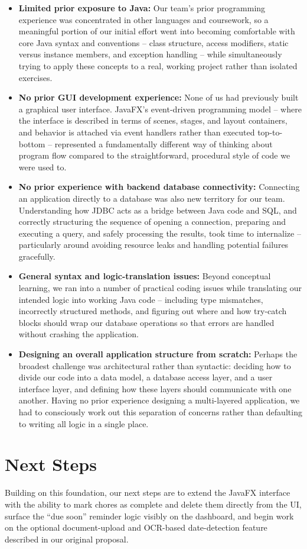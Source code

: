 \documentclass[11pt,a4paper]{article}
\begin{document}
\begin{itemize}[leftmargin=0.7cm]
    \item \textbf{Limited prior exposure to Java:} Our team's prior programming experience was concentrated in other languages and coursework, so a meaningful portion of our initial effort went into becoming comfortable with core Java syntax and conventions -- class structure, access modifiers, static versus instance members, and exception handling -- while simultaneously trying to apply these concepts to a real, working project rather than isolated exercises.

    \item \textbf{No prior GUI development experience:} None of us had previously built a graphical user interface. JavaFX's event-driven programming model -- where the interface is described in terms of scenes, stages, and layout containers, and behavior is attached via event handlers rather than executed top-to-bottom -- represented a fundamentally different way of thinking about program flow compared to the straightforward, procedural style of code we were used to.

    \item \textbf{No prior experience with backend database connectivity:} Connecting an application directly to a database was also new territory for our team. Understanding how JDBC acts as a bridge between Java code and SQL, and correctly structuring the sequence of opening a connection, preparing and executing a query, and safely processing the results, took time to internalize -- particularly around avoiding resource leaks and handling potential failures gracefully.

    \item \textbf{General syntax and logic-translation issues:} Beyond conceptual learning, we ran into a number of practical coding issues while translating our intended logic into working Java code -- including type mismatches, incorrectly structured methods, and figuring out where and how try-catch blocks should wrap our database operations so that errors are handled without crashing the application.

    \item \textbf{Designing an overall application structure from scratch:} Perhaps the broadest challenge was architectural rather than syntactic: deciding how to divide our code into a data model, a database access layer, and a user interface layer, and defining how these layers should communicate with one another. Having no prior experience designing a multi-layered application, we had to consciously work out this separation of concerns rather than defaulting to writing all logic in a single place.
\end{itemize}

\section{Next Steps}
Building on this foundation, our next steps are to extend the JavaFX interface with the ability to mark chores as complete and delete them directly from the UI, surface the ``due soon'' reminder logic visibly on the dashboard, and begin work on the optional document-upload and OCR-based date-detection feature described in our original proposal.
\end{document}
